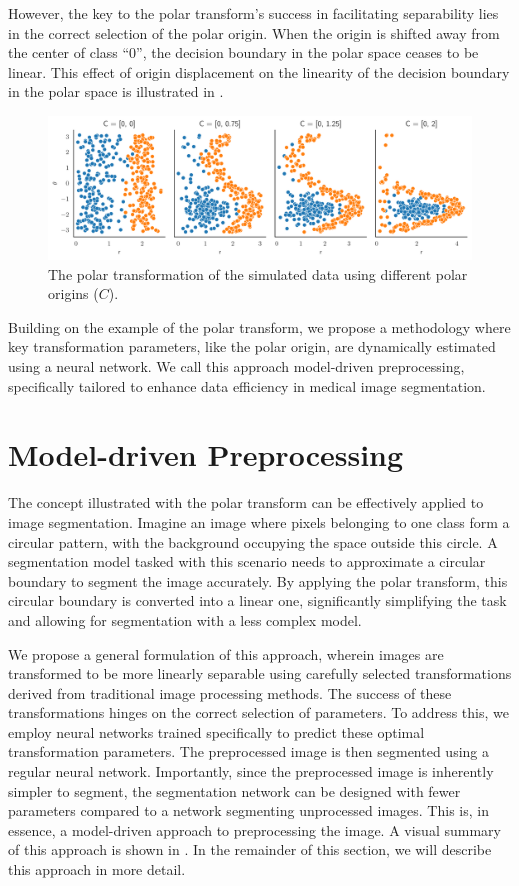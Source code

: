 However, the key to the polar transform's success in facilitating separability lies in the correct selection of the polar origin. When the origin is shifted away from the center of class ``0'', the decision boundary in the polar space ceases to be linear. This effect of origin displacement on the linearity of the decision boundary in the polar space is illustrated in .

 	\begin{figure}[t!]
		\centering
		\includegraphics[width=\linewidth]{images/4/data_polar_origin}
		\caption{The polar transformation of the simulated data using different polar origins ($C$).}
		\label{fig:polar-origin-selection}
	\end{figure}
	
	Building on the example of the polar transform, we propose a methodology where key transformation parameters, like the polar origin, are dynamically estimated using a neural network. We call this approach model-driven preprocessing, specifically tailored to enhance data efficiency in medical image segmentation.
	
\section{Model-driven Preprocessing}

The concept illustrated with the polar transform can be effectively applied to image segmentation. Imagine an image where pixels belonging to one class form a circular pattern, with the background occupying the space outside this circle. A segmentation model tasked with this scenario needs to approximate a circular boundary to segment the image accurately. By applying the polar transform, this circular boundary is converted into a linear one, significantly simplifying the task and allowing for segmentation with a less complex model.

We propose a general formulation of this approach, wherein images are transformed to be more linearly separable using carefully selected transformations derived from traditional image processing methods. The success of these transformations hinges on the correct selection of parameters. To address this, we employ neural networks trained specifically to predict these optimal transformation parameters. The preprocessed image is then segmented using a regular neural network. Importantly, since the preprocessed image is inherently simpler to segment, the segmentation network can be designed with fewer parameters compared to a network segmenting unprocessed images. This is, in essence, a model-driven approach to preprocessing the image. A visual summary of this approach is shown in . In the remainder of this section, we will describe this approach in more detail.


